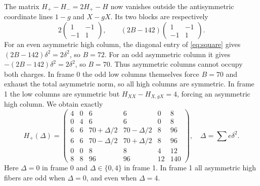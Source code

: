 \documentclass[10pt]{article}
\begin{document}
The matrix $H_+-H_-=2H_+-H$ now vanishes outside the antisymmetric coordinate lines $1-g$ and $X-gX$. Its two blocks are respectively
\[
 2\begin{pmatrix}1&-1\\-1&1\end{pmatrix},\qquad
 (2B-142)\begin{pmatrix}1&-1\\-1&1\end{pmatrix}.
\]
For an even asymmetric high column, the diagonal entry of \eqref{eq:square} gives $(2B-142)\delta^2=2\delta^2$, so $B=72$. For an odd asymmetric column it gives $-(2B-142)\delta^2=2\delta^2$, so $B=70$. Thus asymmetric columns cannot occupy both charges. In frame 0 the odd low columns themselves force $B=70$ and exhaust the total asymmetric norm, so all high columns are symmetric. In frame 1 the low columns are symmetric but $H_{XX}-H_{X,gX}=4$, forcing an asymmetric high column. We obtain exactly
\begin{equation}\label{eq:finalgram}
 H_+(\Delta)=\begin{pmatrix}
 4&0&6&6&0&8\\0&4&6&6&0&8\\
 6&6&70+\Delta/2&70-\Delta/2&8&96\\
 6&6&70-\Delta/2&70+\Delta/2&8&96\\
 0&0&8&8&4&12\\8&8&96&96&12&140
 \end{pmatrix},
 \quad\Delta=\sum e\delta^2.
\end{equation}
Here $\Delta=0$ in frame 0 and $\Delta\in\{0,4\}$ in frame 1. In frame 1 all asymmetric high fibers are odd when $\Delta=0$, and even when $\Delta=4$.
\end{document}
